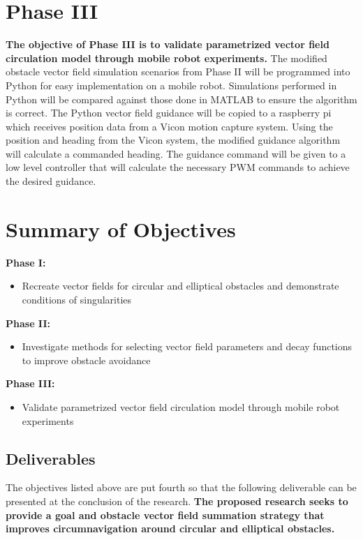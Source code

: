 \documentclass[numbered,pdftex]{ohio-etd}
\begin{document}
\section{Phase III}
\textbf{The objective of Phase III is to validate parametrized vector field circulation model through mobile robot experiments.} The modified obstacle vector field simulation scenarios from Phase II will be programmed into Python for easy implementation on a mobile robot. Simulations performed in Python will be compared against those done in MATLAB to ensure the algorithm is correct. The Python vector field guidance will be copied to a raspberry pi which receives position data from a Vicon motion capture system. Using the position and heading from the Vicon system, the modified guidance algorithm will calculate a commanded heading. The guidance command will be given to a low level controller that will calculate the necessary PWM commands to achieve the desired guidance.


\section{Summary of Objectives}
\textbf{Phase I:}
\begin{itemize}
\item Recreate vector fields for circular and elliptical obstacles and demonstrate conditions of singularities
\end{itemize}

\textbf{Phase II:}
\begin{itemize}
	\item Investigate methods for selecting vector field parameters and decay functions to improve obstacle avoidance 
\end{itemize}

\textbf{Phase III:}
\begin{itemize}
\item Validate parametrized vector field circulation model through mobile robot experiments
\end{itemize}




\subsection{Deliverables}
The objectives listed above are put fourth so that the following deliverable can be presented at the conclusion of the research. \textbf{The proposed research seeks to provide a goal and obstacle vector field summation strategy that improves circumnavigation around circular and elliptical obstacles.}
\end{document}
